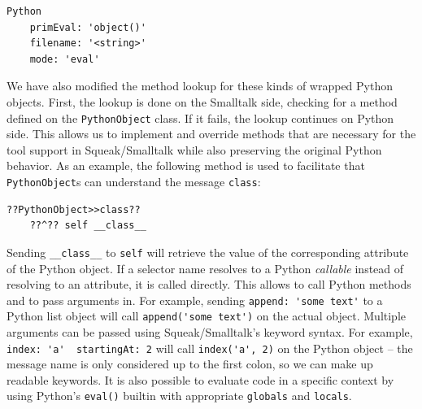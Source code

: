 \documentclass[sigconf,english]{acmart}
\newcommand*\Squeak{Squeak\slash Smalltalk\xspace}
\begin{document}
\begin{lstlisting}[style=SmalltalkStyle]
  Python
    primEval: 'object()'
    filename: '<string>'
    mode: 'eval'
\end{lstlisting}



We have also modified the method lookup for these kinds of wrapped Python
objects. First, the lookup is done on the Smalltalk side, checking for a method
defined on the \lstinline{PythonObject} class. If it fails, the lookup continues
on Python side. This allows us to implement and override methods that are
necessary for the tool support in \Squeak while also preserving the original
Python behavior. As an example, the following method is used to facilitate that
\lstinline{PythonObject}s can understand the message \lstinline{class}:

\begin{lstlisting}[style=SmalltalkStyle]
??PythonObject>>class??
    ??^?? self __class__
\end{lstlisting}

Sending \lstinline{__class__} to \lstinline{self} will retrieve the value
of the corresponding attribute of the Python object. If a selector name
resolves to a Python \emph{callable} instead of resolving to an attribute, it is
called directly. This allows to call Python methods and to pass arguments in.
For example, sending \lstinline{append: 'some text'} to a Python list
object will call \lstinline{append('some text')} on the actual object.
Multiple arguments can be passed using \Squeak's keyword syntax. For example,
\lstinline{index: 'a'  startingAt: 2} will call %
\lstinline{index('a', 2)} on the Python object \--- the message name is
only considered up to the first colon, so we can make up readable keywords.
It is also possible to evaluate code in a specific context by using
Python's \lstinline{eval()} builtin with appropriate \lstinline{globals} and
\lstinline{locals}.
\end{document}
